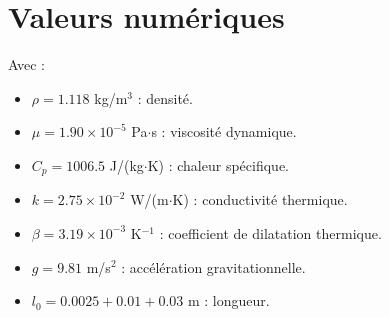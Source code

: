 \documentclass[11pt,a4paper]{article}
\begin{document}
\appendix 

\section{Valeurs numériques}

Avec : 
\begin{itemize}
    \item $\rho = 1.118$ kg/m$^3$ : densité.
    \item $\mu = 1.90 \times 10^{-5}$ Pa$\cdot$s : viscosité dynamique.
    \item $C_p = 1006.5$ J/(kg$\cdot$K) : chaleur spécifique.
    \item $k = 2.75 \times 10^{-2}$ W/(m$\cdot$K) : conductivité thermique.
    \item $\beta = 3.19 \times 10^{-3}$ K$^{-1}$ : coefficient de dilatation thermique.
    \item $g = 9.81$ m/s$^2$ : accélération gravitationnelle.
    \item $l_0 = 0.0025 + 0.01 + 0.03$ m : longueur.
\end{itemize}
\end{document}
